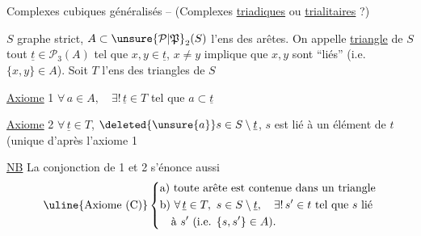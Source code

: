 {{}}

Complexes cubiques généralisés -- (Complexes \uline{triadiques} ou \uline{trialitaires} ?)

$S$ graphe strict, $A\subset\unsure{\mathcal P|\mathfrak P}_2(S)$ l'ens des arêtes. On  appelle \uline{triangle} de $S$ tout $\underline t\in\mathcal P_3(A)$ tel que $x,y\in\underline t$, $x\ne y$ implique que $x,y$ sont ``liés'' (i.e. $\{x,y\}\in A$). Soit $T$ l'ens des triangles de $S$

\uline{Axiome} 1 \quad $\forall\,a\in A,\quad\exists!\,\underline t\in T$ tel que $a\subset\underline t$

\uline{Axiome} 2 \quad $\forall\,\underline t\in T$, $\deleted{\unsure{a}}s\in S\setminus\underline t$, $s$ est lié à un élément de $t$ (unique d'après l'axiome 1

\uline{NB} La conjonction de 1 et 2 s'énonce aussi
\[
\uline{\text{Axiome (C)}}\left\{\begin{aligned}
&\text{a) toute arête est contenue dans un triangle}\\
&\text{b) }\forall\,\underline t\in T,\ s\in S\setminus\underline t,\quad\exists!\,s'\in t\ \text{tel que }s\text{ lié}\\
&\quad \text{à }s'\ (\text{i.e. }\{s,s'\}\in A).
\end{aligned}\right.
\]


